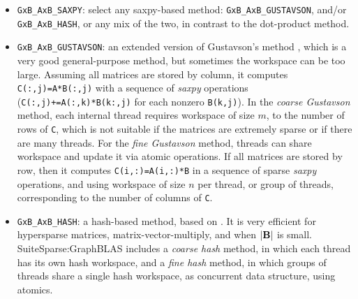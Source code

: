 \documentclass[12pt]{article}
\begin{document}
{\begin{itemize}
\begin{itemize}
    \item \verb'GxB_AxB_SAXPY': select any saxpy-based method:
        \verb'GxB_AxB_GUSTAVSON', and/or
        \verb'GxB_AxB_HASH', or any mix of the two,
        in contrast to the dot-product method.

    \item \verb'GxB_AxB_GUSTAVSON':  an extended version of Gustavson's method
    \cite{Gustavson78}, which is a very good general-purpose method, but
    sometimes the workspace can be too large.  Assuming all matrices are stored
    by column, it computes \verb'C(:,j)=A*B(:,j)' with a sequence of {\em
    saxpy} operations (\verb'C(:,j)+=A(:,k)*B(k:,j)' for each nonzero
    \verb'B(k,j)').  In the {\em coarse Gustavson} method, each internal thread
    requires workspace of size $m$, to the number of rows of \verb'C', which is
    not suitable if the matrices are extremely sparse or if there are many
    threads.  For the {\em fine Gustavson} method, threads can share workspace
    and update it via atomic operations.  If all matrices are stored by row,
    then it computes \verb'C(i,:)=A(i,:)*B' in a sequence of sparse {\em saxpy}
    operations, and using workspace of size $n$ per thread, or group of
    threads, corresponding to the number of columns of \verb'C'.

    \item \verb'GxB_AxB_HASH':  a hash-based method, based on
        \cite{10.1145/3229710.3229720}.  It is very efficient for hypersparse
        matrices, matrix-vector-multiply, and when $|{\bf B}|$ is small.
        SuiteSparse:GraphBLAS includes a {\em coarse hash} method, in which
        each thread has its own hash workspace, and a {\em fine hash}
        method, in which groups of threads share a single hash workspace,
        as concurrent data structure, using atomics.



\end{itemize}
\end{itemize}}
\end{document}
